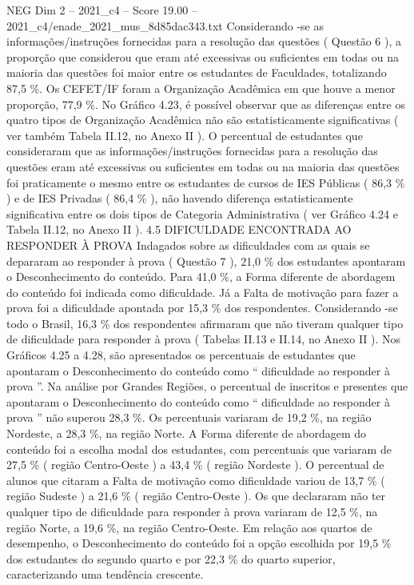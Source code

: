 \begin{textsample}{NEG Dim 2 – 2021\_c4 – Score 19.00 – 2021\_c4/enade\_2021\_mus\_8d85dac343.txt}
Considerando -se as informações/instruções fornecidas para a resolução das questões ( Questão 6 ), a proporção que considerou que eram até excessivas ou suficientes em todas ou na maioria das questões foi maior entre os estudantes de Faculdades, totalizando 87,5 \%.
Os CEFET/IF foram a Organização Acadêmica em que houve a menor proporção, 77,9 \%.
No Gráfico 4.23, é possível observar que as diferenças entre os quatro tipos de Organização Acadêmica não são estatisticamente significativas ( ver também Tabela II.12, no Anexo II ).
O percentual de estudantes que consideraram que as informações/instruções fornecidas para a resolução das questões eram até excessivas ou suficientes em todas ou na maioria das questões foi praticamente o mesmo entre os estudantes de cursos de IES Públicas ( 86,3 \% ) e de IES Privadas ( 86,4 \% ), não havendo diferença estatisticamente significativa entre os dois tipos de Categoria Administrativa ( ver Gráfico 4.24 e Tabela II.12, no Anexo II ). 4.5 DIFICULDADE ENCONTRADA AO RESPONDER À PROVA Indagados sobre as dificuldades com as quais se depararam ao responder à prova ( Questão 7 ), 21,0 \% dos estudantes apontaram o Desconhecimento do conteúdo.
Para 41,0 \%, a Forma diferente de abordagem do conteúdo foi indicada como dificuldade.
Já a Falta de motivação para fazer a prova foi a dificuldade apontada por 15,3 \% dos respondentes.
Considerando -se todo o Brasil, 16,3 \% dos respondentes afirmaram que não tiveram qualquer tipo de dificuldade para responder à prova ( Tabelas II.13 e II.14, no Anexo II ).
Nos Gráficos 4.25 a 4.28, são apresentados os percentuais de estudantes que apontaram o Desconhecimento do conteúdo como “ dificuldade ao responder à prova ”.
Na análise por Grandes Regiões, o percentual de inscritos e presentes que apontaram o Desconhecimento do conteúdo como “ dificuldade ao responder à prova ” não superou 28,3 \%.
Os percentuais variaram de 19,2 \%, na região Nordeste, a 28,3 \%, na região Norte.
A Forma diferente de abordagem do conteúdo foi a escolha modal dos estudantes, com percentuais que variaram de 27,5 \% ( região Centro-Oeste ) a 43,4 \% ( região Nordeste ).
O percentual de alunos que citaram a Falta de motivação como dificuldade variou de 13,7 \% ( região Sudeste ) a 21,6 \% ( região Centro-Oeste ).
Os que declararam não ter qualquer tipo de dificuldade para responder à prova variaram de 12,5 \%, na região Norte, a 19,6 \%, na região Centro-Oeste.
Em relação aos quartos de desempenho, o Desconhecimento do conteúdo foi a opção escolhida por 19,5 \% dos estudantes do segundo quarto e por 22,3 \% do quarto superior, caracterizando uma tendência crescente.

\end{textsample}
